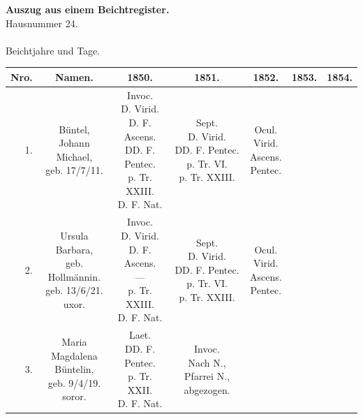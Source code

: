 \begin{quertabelle}
\begin{center}
{\large\bfseries Auszug aus einem Beichtregister.}\\[0.8em]
Hausnummer 24.\\[0.3em]
{\large {}}\\[0.3em]
Beichtjahre und Tage.\\[0.6em]
\footnotesize
\begin{tabular}{|r|c|c|c|c|c|c|}
\hline
Nro. & Namen. & 1850. & 1851. & 1852. & 1853. & 1854. \\ \hline\hline
1. & \zl{Büntel,\\ Johann Michael,\\ geb. 17/7/11.} & \zl{Invoc.\\ D. Virid.\\ D. F. Ascens.\\ DD. F. Pentec.\\ p. Tr. XXIII.\\ D. F. Nat.} & \zl{Sept.\\ D. Virid.\\ DD. F. Pentec.\\ p. Tr. VI.\\ p. Tr. XXIII.} & \zl{Ocul.\\ Virid.\\ Ascens.\\ Pentec.} & & \\ \hline
2. & \zl{Ursula Barbara,\\ geb. Hollmännin.\\ geb. 13/6/21.\\ uxor.} & \zl{Invoc.\\ D. Virid.\\ D. F. Ascens.\\ —\\ p. Tr. XXIII.\\ D. F. Nat.} & \zl{Sept.\\ D. Virid.\\ DD. F. Pentec.\\ p. Tr. VI.\\ p. Tr. XXIII.} & \zl{Ocul.\\ Virid.\\ Ascens.\\ Pentec.} & & \\ \hline
3. & \zl{Maria Magdalena\\ Büntelin,\\ geb. 9/4/19.\\ soror.} & \zl{Laet.\\ DD. F. Pentec.\\ p. Tr. XXII.\\ D. F. Nat.} & \zl{Invoc.\\[1em] Nach N., Pfarrei N.,\\ abgezogen.} & & & \\ \hline

\end{tabular}
\end{center}
\end{quertabelle}
